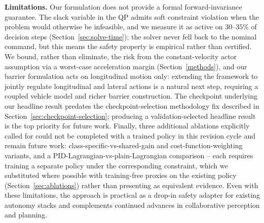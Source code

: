 \textbf{Limitations.} Our formulation does not provide a formal forward-invariance guarantee. The slack variable in the QP admits soft constraint violation when the problem would otherwise be infeasible, and we measure it as active on $30$--$35\%$ of decision steps (Section~\ref{sec:solve-time}); the solver never fell back to the nominal command, but this means the safety property is empirical rather than certified. We bound, rather than eliminate, the risk from the constant-velocity actor assumption via a worst-case acceleration margin (Section~\ref{methods}), and our barrier formulation acts on longitudinal motion only: extending the framework to jointly regulate longitudinal and lateral actions is a natural next step, requiring a coupled vehicle model and richer barrier construction. The checkpoint underlying our headline result predates the checkpoint-selection methodology fix described in Section~\ref{sec:checkpoint-selection}; producing a validation-selected headline result is the top priority for future work. Finally, three additional ablations explicitly called for could not be completed with a trained policy in this revision cycle and remain future work: class-specific-vs-shared-gain and cost-function-weighting variants, and a PID-Lagrangian-vs-plain-Lagrangian comparison -- each requires training a separate policy under the corresponding constraint, which we substituted where possible with training-free proxies on the existing policy (Section~\ref{sec:ablations}) rather than presenting as equivalent evidence. Even with these limitations, the approach is practical as a drop-in safety adapter for existing autonomy stacks and complements continued advances in collaborative perception and planning.
